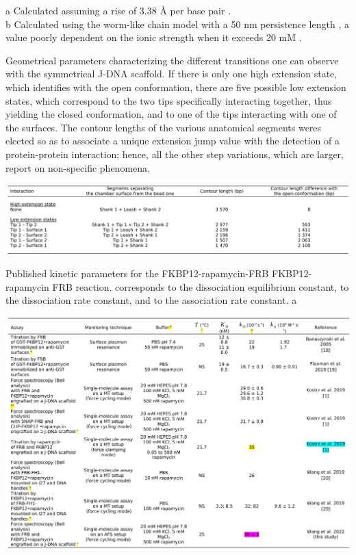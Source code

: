 \documentclass{biophys-new}
\begin{document}
\noindent
a Calculated assuming a rise of 3.38 Å per base pair \cite{smith1996}.\\
b Calculated using the worm-like chain model with a 50 nm persistence length \cite{bouchiat1999, bustamante1994 }, a value poorly dependent on the ionic strength when it exceeds  20 mM \cite{baumann1997}. 

\begin{table}[hbt!] %
	\caption{Geometrical parameters characterizing the different transitions one can observe with the symmetrical J-DNA scaffold. If there is only one high extension state, which identifies with the open conformation, there are five possible low extension states, which correspond to the two tips specifically interacting together, thus yielding the closed conformation, and to one of the tips interacting with one of the surfaces. The contour lengths of the various anatomical segments weres elected so as to associate a unique extension jump value with the detection of a protein-protein interaction; hence, all the other step variations, which are larger, report on non-specific phenomena.}
	\label{tbl:s2}
	\includegraphics[width=\linewidth]{Figures/TableS2pdf.png}
\end{table}


\begin{table}[hbt!] %
	\caption{Published kinetic parameters for the FKBP12-rapamycin-FRB    FKBP12-rapamycin    FRB reaction.  corresponds to the dissociation equilibrium constant,  to the dissociation rate constant, and  to the association rate constant. a}
	\label{tbl:s3}
	\includegraphics[width=\linewidth]{Figures/TableS3pdf.png}
\end{table}
\end{document}

